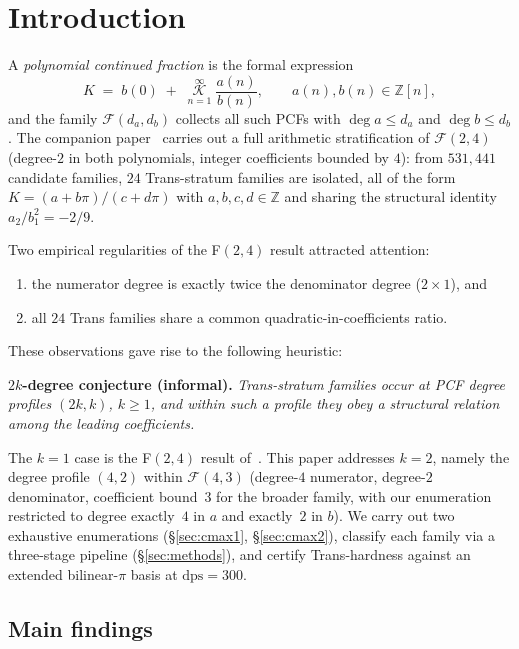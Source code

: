 \documentclass[11pt,a4paper]{amsart}
\theoremstyle{definition}
\theoremstyle{remark}
\newcommand{\FF}{\mathcal{F}}
\newcommand{\KK}{\mathcal{K}}
\newcommand{\dps}{\mathrm{dps}}
\begin{document}
\section{Introduction}\label{sec:intro}

A \emph{polynomial continued fraction} is the formal expression
\[
  K \;=\; b(0) \;+\; \mathop{\mathop{\KK}\nolimits}\limits_{n=1}^{\infty}
        \frac{a(n)}{b(n)},
  \qquad a(n),b(n) \in \mathbb{Z}[n],
\]
and the family $\FF(d_a,d_b)$ collects all such PCFs with $\deg a \le
d_a$ and $\deg b \le d_b$.  The companion paper~\cite{PCF24} carries
out a full arithmetic stratification of $\FF(2,4)$ (degree-$2$ in both
polynomials, integer coefficients bounded by $4$): from $531{,}441$
candidate families, $24$ Trans-stratum families are isolated, all of
the form $K = (a + b\pi)/(c + d\pi)$ with $a,b,c,d \in \mathbb{Z}$ and
sharing the structural identity $a_2/b_1^2 = -2/9$.

Two empirical regularities of the F$(2,4)$ result attracted attention:
\begin{enumerate}[label=(\roman*)]
  \item the numerator degree is exactly twice the denominator degree
        ($2 \times 1$), and
  \item all $24$ Trans families share a common quadratic-in-coefficients
        ratio.
\end{enumerate}
These observations gave rise to the following heuristic:

\medskip
\noindent\textbf{$2k$-degree conjecture (informal).}\quad
\emph{Trans-stratum families occur at PCF degree profiles $(2k,k)$,
$k\ge 1$, and within such a profile they obey a structural relation
among the leading coefficients.}
\medskip

The $k=1$ case is the F$(2,4)$ result of~\cite{PCF24}.  This paper
addresses $k=2$, namely the degree profile $(4,2)$ within $\FF(4,3)$
(degree-$4$ numerator, degree-$2$ denominator, coefficient bound~$3$
for the broader family, with our enumeration restricted to degree
exactly~$4$ in $a$ and exactly~$2$ in $b$).  We carry out two
exhaustive enumerations (\S\ref{sec:cmax1}, \S\ref{sec:cmax2}),
classify each family via a three-stage pipeline (\S\ref{sec:methods}),
and certify Trans-hardness against an extended bilinear-$\pi$ basis at
$\dps=300$.

\subsection{Main findings}
\end{document}
